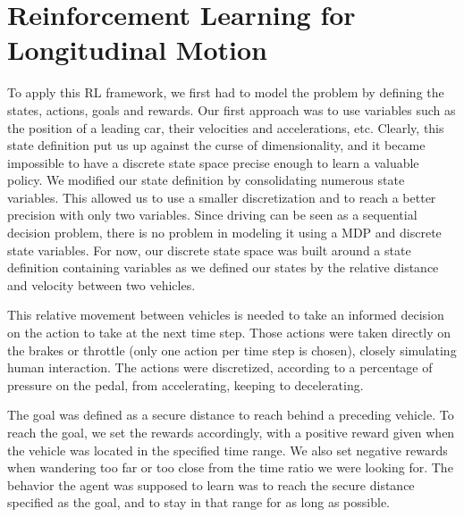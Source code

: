 \section{Reinforcement Learning for Longitudinal Motion}

To apply this RL framework, we first had to model the problem by defining the states, actions, goals and rewards. Our first approach was to use variables such as the position of a leading car, their velocities and accelerations, etc. Clearly, this state definition put us up against the curse of dimensionality, and it became impossible to have a discrete state space precise enough to learn a valuable policy. We modified our state definition by consolidating numerous state variables. This allowed us to use a smaller discretization and to reach a better precision with only two variables. Since driving can be seen as a sequential decision problem, there is no problem in modeling it using a MDP and discrete state variables. For now, our discrete state space was built around a state definition containing variables as we defined our states by the relative distance and velocity between two vehicles.

This relative movement between vehicles is needed to take an informed decision on the action to take at the next time step. Those actions were taken directly on the brakes or throttle (only one action per time step is chosen), closely simulating human interaction. The actions were discretized, according to a percentage of pressure on the pedal, from accelerating, keeping to decelerating.

The goal was defined as a secure distance to reach behind a preceding vehicle. To reach the goal, we set the rewards accordingly, with a positive reward given when the vehicle was located in the specified time range. We also set negative rewards when wandering too far or too close from the time ratio we were looking for. The behavior the agent was supposed to learn was to reach the secure distance specified as the goal, and to stay in that range for as long as possible.

